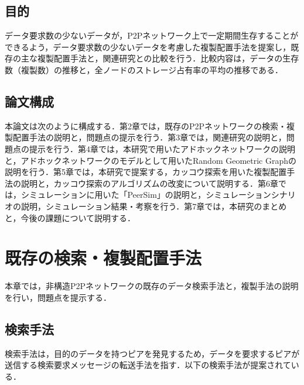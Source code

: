 \documentclass[11pt]{jreport}
\begin{document}
\section{目的}
データ要求数の少ないデータが，P2Pネットワーク上で一定期間生存することができるよう，データ要求数の少ないデータを考慮した複製配置手法を提案し，既存の主な複製配置手法と，関連研究との比較を行う．比較内容は，データの生存数（複製数）の推移と，全ノードのストレージ占有率の平均の推移である．

\section{論文構成}
本論文は次のように構成する．第2章では，既存のP2Pネットワークの検索・複製配置手法の説明と，問題点の提示を行う．第3章では，関連研究の説明と，問題点の提示を行う．第4章では，本研究で用いたアドホックネットワークの説明と，アドホックネットワークのモデルとして用いたRandom Geometric Graphの説明を行う．第5章では，本研究で提案する，カッコウ探索を用いた複製配置手法の説明と，カッコウ探索のアルゴリズムの改変について説明する．第6章では，シミュレーションに用いた「PeerSim」の説明と，シミュレーションシナリオの説明，シミュレーション結果・考察を行う．第7章では，本研究のまとめと，今後の課題について説明する．



\chapter{既存の検索・複製配置手法}
本章では，非構造P2Pネットワークの既存のデータ検索手法と，複製手法の説明を行い，問題点を提示する．

\section{検索手法}
検索手法は，目的のデータを持つピアを発見するため，データを要求するピアが送信する検索要求メッセージの転送手法を指す．以下の検索手法が提案されている\cite{maruta}．
\end{document}
